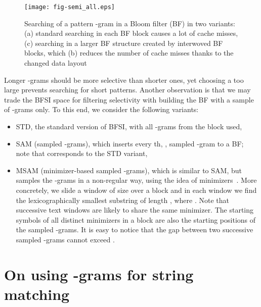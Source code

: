\documentclass{llncs}
\begin{document}
 
\begin{figure}
\centerline{
\texttt{[image: fig-semi\_all.eps]}
}
\caption[Illustration]
{Searching of a pattern -gram in a Bloom filter (BF) in two variants: 
(a) standard searching in each BF block causes a lot of cache misses, 
(c) searching in a larger BF structure created by interwoved BF blocks, 
which (b) reduces the number of cache misses thanks to the changed data layout}
\label{fig:semi_all}
\end{figure}

Longer -grams should be more selective than shorter ones, 
yet choosing a too large  prevents searching for short patterns.
Another observation is that we may trade the BFSI space for filtering 
selectivity with building the BF with a sample of -grams only.
To this end, we consider the following variants:
\begin{itemize}
\item STD, the standard version of BFSI, with all -grams from the block used,
\item SAM (sampled -grams), which inserts every th, , 
sampled -gram to a BF; note that  corresponds to the STD variant,
\item MSAM (minimizer-based sampled -grams), which is similar to SAM, 
but samples the -grams in a non-regular way, using the idea of 
minimizers~\cite{RHHMY2004}.
More concretely, we slide a window of size  over a block 
and in each window we find the lexicographically smallest substring of length , 
where .
Note that successive text windows are likely to share the same minimizer.
The starting symbols of all distinct minimizers in a block are also the starting 
positions of the sampled -grams.
It is easy to notice that the gap between two successive sampled -grams 
cannot exceed .
\end{itemize}


\section{On using -grams for string matching}
\end{document}
